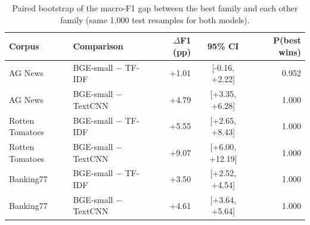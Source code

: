 \begin{table}[H]
\centering
\small
\caption{Paired bootstrap of the macro-F1 gap between the best family and each other family (same 1{,}000 test resamples for both models).}\label{tab:paired}
\begin{tabular}{@{}llrcr@{}}
\toprule
Corpus & Comparison & $\Delta$F1 (pp) & 95\% CI & P(best wins) \\
\midrule
AG News & BGE-small $-$ TF-IDF & +1.01 & [-0.16, +2.22] & 0.952 \\
AG News & BGE-small $-$ TextCNN & +4.79 & [+3.35, +6.28] & 1.000 \\
Rotten Tomatoes & BGE-small $-$ TF-IDF & +5.55 & [+2.65, +8.43] & 1.000 \\
Rotten Tomatoes & BGE-small $-$ TextCNN & +9.07 & [+6.00, +12.19] & 1.000 \\
Banking77 & BGE-small $-$ TF-IDF & +3.50 & [+2.52, +4.54] & 1.000 \\
Banking77 & BGE-small $-$ TextCNN & +4.61 & [+3.64, +5.64] & 1.000 \\
\bottomrule
\end{tabular}
\end{table}
